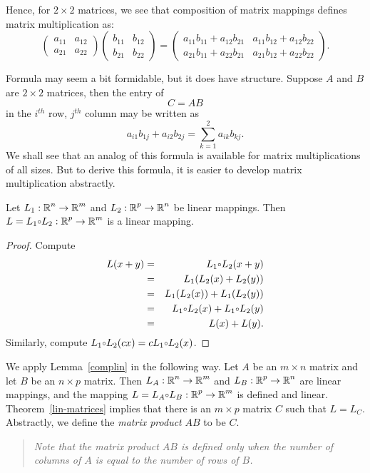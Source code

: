 \documentclass{ximera}
\begin{document}
Hence, for $2\times 2$ matrices, we see that composition of
matrix mappings defines matrix multiplication
as:
\begin{equation}  \label{2x2mult}
\left(\begin{array}{rr} a_{11} & a_{12}\\ a_{21} &
a_{22}\end{array}\right)
\left(\begin{array}{rr} b_{11} & b_{12}\\ b_{21} &
b_{22}\end{array}\right)
=\left(\begin{array}{rr} a_{11}b_{11}+a_{12}b_{21} &
a_{11}b_{12}+a_{12}b_{22}
\\ a_{21}b_{11}+a_{22}b_{21} & a_{21}b_{12}+a_{22}b_{22}
\end{array}\right).
\end{equation}

Formula  may seem a bit formidable, but it does
have structure.  Suppose $A$ and $B$ are $2\times 2$ matrices,
then the entry of
\[
C=AB
\]
in the $i^{th}$ row, $j^{th}$ column may be written as
\[
a_{i1}b_{1j} + a_{i2}b_{2j} = \sum_{k=1}^2 a_{ik}b_{kj}.
\]
We shall see that an analog of this formula is available for
matrix multiplications of all sizes.  But to derive this
formula, it is easier to develop matrix multiplication
abstractly.


\begin{lemma}  \label{complin}
Let $L_1:\mbox{$\Bbb{R}$}^n\to\mbox{$\Bbb{R}$}^m$ and $L_2:\mbox{$\Bbb{R}$}^p\to\mbox{$\Bbb{R}$}^n$ be linear mappings.
Then $L=L_1\compose L_2:\R^p\to\R^m$ is a linear mapping.
\end{lemma}

\begin{proof}  Compute
\begin{eqnarray*}
L(x+y) & = & L_1\compose L_2(x+y)\\
 & = & L_1(L_2(x)+L_2(y)) \\
 & = & L_1(L_2(x)) + L_1(L_2(y))\\
 & = & L_1\compose L_2(x) + L_1\compose L_2(y)\\
 & = & L(x) + L(y).
\end{eqnarray*}
Similarly, compute $L_1\compose L_2(cx) = cL_1\compose L_2(x)$.
\end{proof}

We apply Lemma~\ref{complin} in the following way.  Let $A$ be
an $m\times n$ matrix and let $B$ be an $n\times p$
matrix.  Then $L_A:\mbox{$\Bbb{R}$}^n\to\mbox{$\Bbb{R}$}^m$ and $L_B:\mbox{$\Bbb{R}$}^p\to\mbox{$\Bbb{R}$}^n$ are linear
mappings, and the mapping $L=L_A\compose L_B:\R^p\to\R^m$ is
defined and linear.  Theorem~\ref{lin-matrices} implies that
there is an $m\times p$ matrix $C$ such that $L=L_C$.
Abstractly, we define the {\em matrix product\/} 
$AB$ to be $C$.
\begin{quote}
{\em Note that the matrix product $AB$ is defined only when the number of
columns of $A$ is equal to the number of rows of $B$.}
\end{quote}
\end{document}
